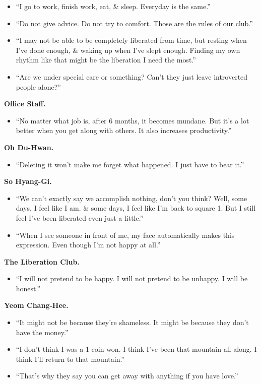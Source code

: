 \documentclass{article}
\begin{document}
\begin{enumerate}
\begin{itemize}
		\item ``I go to work, finish work, eat, \& sleep. Everyday is the same.''
		\item ``Do not give advice. Do not try to comfort. Those are the rules of our club.''
		\item ``I may not be able to be completely liberated from time, but resting when I've done enough, \& waking up when I've slept enough. Finding my own rhythm like that might be the liberation I need the most.''
		\item ``Are we under special care or something? Can't they just leave introverted people alone?''
	\end{itemize}
	\textbf{Office Staff.}
	\begin{itemize}
		\item ``No matter what job is, after 6 months, it becomes mundane. But it's a lot better when you get along with others. It also increases productivity.''
	\end{itemize}
	\textbf{Oh Du-Hwan.}
	\begin{itemize}
		\item ``Deleting it won't make me forget what happened. I just have to bear it.''
	\end{itemize}
	\textbf{So Hyang-Gi.}
	\begin{itemize}
		\item ``We can't exactly say we accomplish nothing, don't you think? Well, some days, I feel like I am. \& some days, I feel like I'm back to square 1. But I still feel I've been liberated even just a little.''
		\item ``When I see someone in front of me, my face automatically makes this expression. Even though I'm not happy at all.''
	\end{itemize}
	\textbf{The Liberation Club.}
	\begin{itemize}
		\item ``I will not pretend to be happy. I will not pretend to be unhappy. I will be honest.''
	\end{itemize}
	\textbf{Yeom Chang-Hee.}
	\begin{itemize}
		\item ``It might not be because they're shameless. It might be because they don't have the money.''
		\item ``I don't think I was a 1-coin won. I think I've been that mountain all along. I think I'll return to that mountain.''
		\item ``That's why they say you can get away with anything if you have love.''

\end{itemize}
\end{enumerate}
\end{document}
